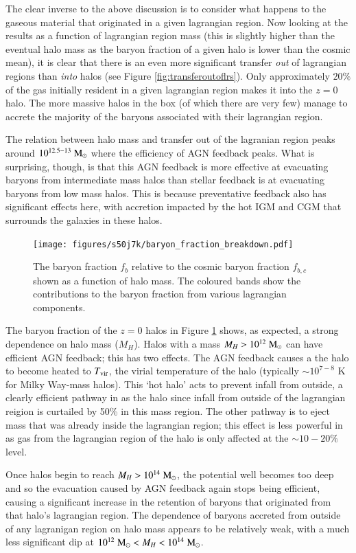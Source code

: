 The clear inverse to the above discussion is to consider what happens to the gaseous
material that originated in a given lagrangian region. Now looking at the results as
a function of lagrangian region mass (this is slightly higher than the eventual
halo mass as the baryon fraction of a given halo is lower than the cosmic mean), it
is clear that there is an even more significant transfer \emph{out} of lagrangian
regions than \emph{into} halos (see Figure \ref{fig:transferoutoflrs}). Only 
approximately $20\%$ of the gas initially resident in a given lagrangian region
makes it into the $z=0$ halo. The more massive halos in the box (of which there 
are very few) manage to accrete the majority of the baryons associated with their
lagrangian region.

The relation between halo mass and transfer out of the lagranian region peaks
around $10^{12.5-13}\;{\rm M}_{\odot}{}$ where the efficiency of AGN feedback peaks. What
is surprising, though, is that this AGN feedback is more effective at evacuating
baryons from intermediate mass halos than stellar feedback is at evacuating
baryons from low mass halos. This is because preventative feedback also has
significant effects here, with accretion impacted by the hot IGM and CGM that
surrounds the galaxies in these halos.

\begin{figure}
	\centering
	\texttt{[image: figures/s50j7k/baryon\_fraction\_breakdown.pdf]}
	\vspace{-0.7cm}
	\caption{The baryon fraction $f_b$ relative to the cosmic baryon fraction
	$f_{b, c}$ shown as a function of halo mass. The coloured bands show the
	contributions to the baryon fraction from various lagrangian components.}
	\label{fig:baryonfraction}
\end{figure}

The baryon fraction of the $z=0$ halos in Figure \ref{fig:baryonfraction}
shows, as expected, a strong dependence on halo mass ($M_H$). Halos with a
mass  $M_H > 10^{12} \;{\rm M}_{\odot}{}$ can have efficient AGN feedback; this has two
effects. The AGN feedback causes a the halo to become heated to $T_{\rm
vir}$, the virial temperature of the halo (typically $\sim10^{7-8}$ K for Milky
Way-mass halos). This `hot halo' acts to prevent infall from outside, a
clearly efficient pathway in \simba{} as the halo since infall from outside of
the lagrangian reigion is curtailed by 50\% in this mass region.  The other
pathway is to eject mass that was already inside the lagrangian region; this
effect is less powerful in \simba{} as gas from the lagrangian region of the
halo is only affected at the $\sim10-20\%$ level.

Once halos begin to reach $M_H > 10^{14} \;{\rm M}_{\odot}{}$, the potential well
becomes too deep and so the evacuation caused by AGN feedback again stops
being efficient, causing a significant increase in the retention of baryons
that originated from that halo's lagrangian region. The dependence of baryons
accreted from outside of any lagranigan region on halo mass appears to be
relatively weak, with a much less significant dip at $10^{12} \;{\rm M}_{\odot}{} < M_H
< 10^{14} \;{\rm M}_{\odot}{}$.
